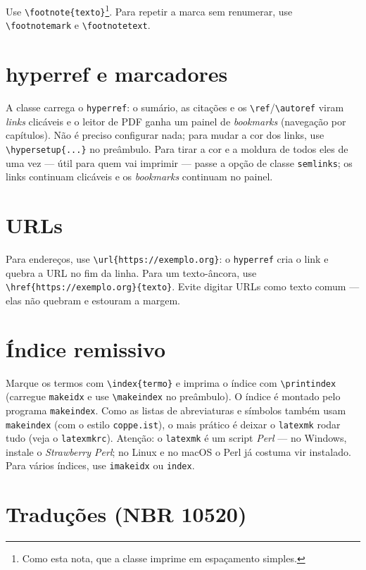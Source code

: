 \documentclass[dsc,pdfa]{coppe}
\begin{document}
  Use \verb|\footnote{texto}|\footnote{Como esta nota, que a classe imprime em espaçamento simples.}. Para repetir a marca sem renumerar, use \verb|\footnotemark| e \verb|\footnotetext|.

  \section{hyperref e marcadores}

  A classe carrega o \verb|hyperref|: o sumário, as citações e os \verb|\ref|/\verb|\autoref| viram \emph{links} clicáveis e o leitor de PDF ganha um painel de \emph{bookmarks} (navegação por capítulos). Não é preciso configurar nada; para mudar a cor dos links, use \verb|\hypersetup{...}| no preâmbulo. Para tirar a cor e a moldura de todos eles de uma vez --- útil para quem vai imprimir --- passe a opção de classe \verb|semlinks|; os links continuam clicáveis e os \emph{bookmarks} continuam no painel.

  \section{URLs}

  Para endereços, use \verb|\url{https://exemplo.org}|: o \verb|hyperref| cria o link e quebra a URL no fim da linha. Para um texto-âncora,
use \verb|\href{https://exemplo.org}{texto}|. Evite digitar URLs como texto comum --- elas não quebram e estouram a margem.

  \section{Índice remissivo}

  Marque os termos com \verb|\index{termo}| e imprima o índice com \verb|\printindex| (carregue \verb|makeidx| e use \verb|\makeindex| no preâmbulo). O índice é montado pelo programa \verb|makeindex|. Como as listas de abreviaturas e símbolos também usam \verb|makeindex| (com o estilo \verb|coppe.ist|), o mais prático é deixar o \verb|latexmk| rodar tudo (veja o \texttt{latexmkrc}). Atenção: o \verb|latexmk| é um script \emph{Perl} --- no Windows, instale o \emph{Strawberry Perl}; no Linux e no macOS o Perl já costuma vir instalado. Para vários índices, use \verb|imakeidx| ou \verb|index|.

  \section{Traduções (NBR 10520)}
\end{document}
